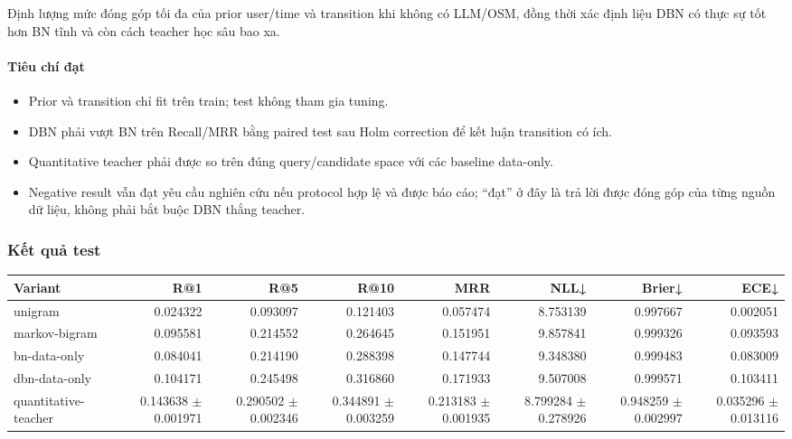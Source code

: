 Định lượng mức đóng góp tối đa của prior user/time và transition khi không có LLM/OSM, đồng thời xác định liệu DBN có thực sự tốt hơn BN tĩnh và còn cách teacher học sâu bao xa.

\paragraph{Tiêu chí đạt}

\begin{itemize}
\item Prior và transition chỉ fit trên train; test không tham gia tuning.
\item DBN phải vượt BN trên Recall/MRR bằng paired test sau Holm correction để kết
luận transition có ích.

\item Quantitative teacher phải được so trên đúng query/candidate space với các
baseline data-only.

\item Negative result vẫn đạt yêu cầu nghiên cứu nếu protocol hợp lệ và được báo
cáo; “đạt” ở đây là trả lời được đóng góp của từng nguồn dữ liệu, không phải bắt buộc DBN thắng teacher.

\end{itemize}

\subsubsection*{Kết quả test}

\begin{table}[!htbp]
\centering
\scriptsize
\setlength{\tabcolsep}{2.5pt}
\begin{adjustbox}{max width=\textwidth}
\begin{tabular}{@{}lrrrrrrr@{}}
\toprule
Variant & R@1 & R@5 & R@10 & MRR & NLL↓ & Brier↓ & ECE↓ \\
\midrule
unigram & 0.024322 & 0.093097 & 0.121403 & 0.057474 & 8.753139 & 0.997667 & 0.002051 \\
markov-bigram & 0.095581 & 0.214552 & 0.264645 & 0.151951 & 9.857841 & 0.999326 & 0.093593 \\
bn-data-only & 0.084041 & 0.214190 & 0.288398 & 0.147744 & 9.348380 & 0.999483 & 0.083009 \\
dbn-data-only & 0.104171 & 0.245498 & 0.316860 & 0.171933 & 9.507008 & 0.999571 & 0.103411 \\
quantitative-teacher & 0.143638 $\pm$ 0.001971 & 0.290502 $\pm$ 0.002346 & 0.344891 $\pm$ 0.003259 & 0.213183 $\pm$ 0.001935 & 8.799284 $\pm$ 0.278926 & 0.948259 $\pm$ 0.002997 & 0.035296 $\pm$ 0.013116 \\
\bottomrule
\end{tabular}
\end{adjustbox}
\end{table}

